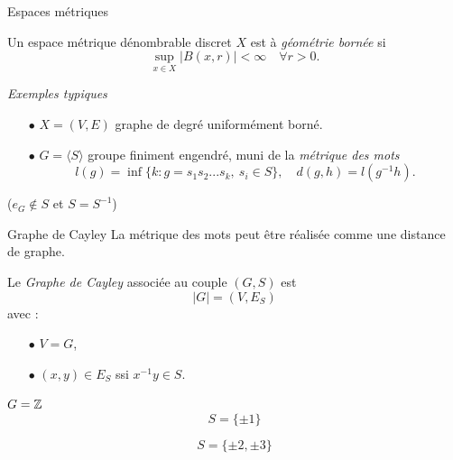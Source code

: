 \begin{frame}{Espaces m\'etriques}
\begin{definition}
Un espace m\'etrique d\'enombrable discret  $X$ est \`a \textit{g\'eom\'etrie born\'ee} si
\[\sup_{x\in X} | B(x,r)| < \infty \quad \forall r >0.\]
\end{definition}
\textit{Exemples typiques}\\
\vfill
\begin{itemize}
\item[$\bullet$] $X=(V,E)$ graphe de degr\'e uniform\'ement born\'e.
\vfill
\item[$\bullet$] $G=\langle S \rangle$ groupe finiment engendr\'e, muni de la \textit{m\'etrique des mots}\\
\[l(g) = \inf\{k : g = s_1 s_2 ... s_k , \ s_i \in S\}, \quad d(g,h) = l(g^{-1}h).\]
\end{itemize}
\vfill
($e_G\notin S$ et $S=S^{-1}$)
\end{frame}

\begin{frame}{Graphe de Cayley}
La m\'etrique des mots peut \^{e}tre r\'ealis\'ee comme une distance de graphe.\\
\vfill
\begin{definition}
Le \textit{Graphe de Cayley} associ\'ee au couple $(G,S)$ est 
\[|G| = (V,E_S)\]
avec : 
\vfill
\begin{itemize}
\item[$\bullet$] $V=G$,
\vfill
\item[$\bullet$] $(x,y)\in E_S$ ssi $x^{-1}y\in S$.
\end{itemize}
\end{definition}
\vfill
\end{frame}

\begin{frame}{$G=\mathbb Z$}
\[S= \{\pm 1\}\]
\[S= \{\pm 2 , \pm 3\}\]
\end{frame}

